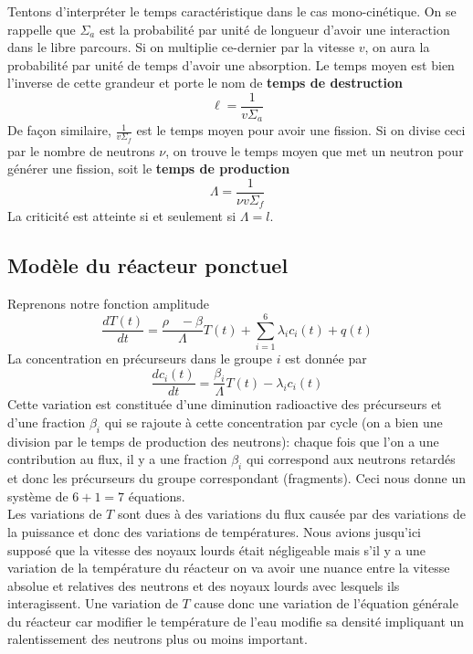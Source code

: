 Tentons d'interpréter le temps caractéristique dans le cas mono-cinétique. On se rappelle que 
$\Sigma_a$ est la probabilité par unité de longueur d'avoir une interaction dans le libre 
parcours. Si on multiplie ce-dernier par la vitesse $v$, on aura la probabilité par unité de temps
d'avoir une absorption. Le temps moyen est bien l'inverse de cette grandeur et porte le nom de 
\textbf{temps de destruction}
\begin{equation}
\ell  = \frac{1}{{v{\Sigma _a}}}
\end{equation}
De façon similaire, $\frac{1}{v\Sigma_f}$ est le temps moyen pour avoir une fission. Si on divise 
ceci par le nombre de neutrons $\nu$, on trouve le temps moyen que met un neutron pour générer une 
fission, soit le \textbf{temps de production}
\begin{equation}
\Lambda  = \frac{1}{{\nu v{\Sigma _f}}}
\end{equation}
La criticité est atteinte si et seulement si $\Lambda=l$.


\subsection{Modèle du réacteur ponctuel}
Reprenons notre fonction amplitude
\begin{equation}
\frac{{dT(t)}}{{dt}} = \frac{{\rho \;\;\; - \beta }}{\Lambda }T(t) + \sum\limits_{i = 1}^6   {\lambda _i}{c_i}(t) + q(t)
\end{equation}
La concentration en précurseurs dans le groupe $i$ est donnée par
\begin{equation}
\frac{{d{c_i}(t)}}{{dt}} = \frac{{{\beta _i}}}{\Lambda }T(t) - {\lambda _i}{c_i}(t)
\end{equation}
Cette variation est constituée d'une diminution radioactive des précurseurs et d'une fraction 
$\beta_i$ qui se rajoute à cette concentration par cycle (on a bien une division par le temps de
production des neutrons): chaque fois que l'on a une contribution au flux, il y a une fraction
$\beta_i$ qui correspond aux neutrons retardés et donc les précurseurs du groupe correspondant 
(fragments). Ceci nous donne un système de $6+1=7$ équations. \\

Les variations de $T$ sont dues à des variations du flux causée par des variations de la puissance 
et donc des variations de températures. Nous avions jusqu'ici supposé que la vitesse des noyaux 
lourds était négligeable mais s'il y a une variation de la température du réacteur on va avoir une
nuance entre la vitesse absolue et relatives des neutrons et des noyaux lourds avec lesquels ils 
interagissent. Une variation de $T$ cause donc une variation de l'équation générale du réacteur car 
modifier le température de l'eau modifie sa densité impliquant un ralentissement des neutrons plus
ou moins important. \\

